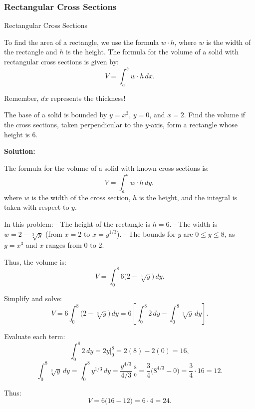 \documentclass[12pt]{article}
\theoremstyle{beautifulthm}
\begin{document}
\newpage
\subsubsection{Rectangular Cross Sections}
\begin{mytheorem}{Rectangular Cross Sections}{}

To find the area of a rectangle, we use the formula $w \cdot h$, where $w$ is the width of the rectangle and $h$ is the height. The formula for the volume of a solid with rectangular cross sections is given by:
\[
V = \int_a^b w \cdot h \, dx.
\]

Remember, $dx$ represents the thickness!
    
\end{mytheorem}



\begin{tcolorbox}[colback=examplebg, colframe=red!75!black, title=\textbf{EXAMPLE 1: Volumes with Cross Sections: Squares and Rectangles}, fonttitle=\bfseries, sharp corners]

The base of a solid is bounded by $y = x^3$, $y = 0$, and $x = 2$. Find the volume if the cross sections, taken perpendicular to the $y$-axis, form a rectangle whose height is 6.

\tcblower
\textbf{Solution:} 

The formula for the volume of a solid with known cross sections is:
\[
V = \int_a^b w \cdot h \, dy,
\]
where $w$ is the width of the cross section, $h$ is the height, and the integral is taken with respect to $y$.

In this problem:
- The height of the rectangle is $h = 6$.
- The width is $w = 2 - \sqrt[3]{y}$ (from $x = 2$ to $x = y^{1/3}$).
- The bounds for $y$ are $0 \leq y \leq 8$, as $y = x^3$ and $x$ ranges from $0$ to $2$.

Thus, the volume is:
\[
V = \int_0^8 6 \big(2 - \sqrt[3]{y}\big) \, dy.
\]

Simplify and solve:
\[
V = 6 \int_0^8 \big(2 - \sqrt[3]{y}\big) \, dy = 6 \left[\int_0^8 2 \, dy - \int_0^8 \sqrt[3]{y} \, dy\right].
\]

Evaluate each term:
\[
\int_0^8 2 \, dy = 2y \Big|_0^8 = 2(8) - 2(0) = 16,
\]
\[
\int_0^8 \sqrt[3]{y} \, dy = \int_0^8 y^{1/3} \, dy = \frac{y^{4/3}}{4/3} \Big|_0^8 = \frac{3}{4} \big(8^{4/3} - 0\big) = \frac{3}{4} \cdot 16 = 12.
\]

Thus:
\[
V = 6 \big(16 - 12\big) = 6 \cdot 4 = 24.
\]
\end{tcolorbox}
\end{document}
